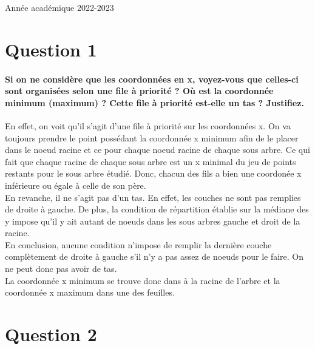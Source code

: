 \documentclass{article}
\begin{document}
\begin{titlepage}
\begin{center}
        {\large Année académique 2022-2023}
        
    \end{center}
\end{titlepage}

\tableofcontents

\newpage

\section{Question 1}
    \paragraph{Si on ne considère que les coordonnées en x, voyez-vous que celles-ci sont organisées selon
    une file à priorité ? Où est la coordonnée minimum (maximum) ? Cette file à priorité est-elle
    un tas ? Justifiez.}
    En effet, on voit qu'il s'agit d'une file à priorité sur les coordonnées x. On va toujours prendre le point possédant la coordonnée x minimum
    afin de le placer dans le noeud racine et ce pour chaque noeud racine de chaque sous arbre. Ce qui fait que chaque racine de chaque sous arbre est un x minimal du
    jeu de points restants pour le sous arbre étudié. Donc, chacun des fils a bien une coordonée x inférieure ou égale à celle de son père.\\
    En revanche, il ne s'agit pas d'un tas. En effet, les couches ne sont pas remplies de droite à gauche. De plus, la condition de répartition établie
    sur la médiane des y impose qu'il y ait autant de noeuds dans les sous arbres gauche et droit de la racine.\\ En conclusion, aucune condition
    n'impose de remplir la dernière couche complètement de droite à gauche s'il n'y a pas assez de noeuds pour le faire. On ne peut donc pas avoir de tas.\\
    La coordonnée x minimum se trouve donc dans à la racine de l'arbre et la 
    coordonnée x maximum dans une des feuilles.

\section{Question 2}
\end{document}
